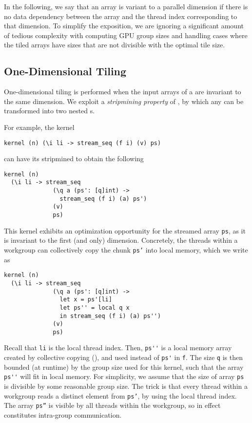 In the following, we say that an array is variant to a parallel
dimension if there is no data dependency between the array and the
thread index corresponding to that dimension.  To simplify the
exposition, we are ignoring a significant amount of tedious complexity
with computing GPU group sizes and handling cases where the tiled
arrays have sizes that are not divisible with the optimal tile size.

\subsection{One-Dimensional Tiling}
\label{sec:one-dimensional-tiling}

One-dimensional tiling is performed when the input arrays of a
\StreamSeq{} are invariant to the same dimension.  We exploit a
\textit{stripmining property} of \StreamSeq{}, by which any
\StreamSeq{} can be transformed into two nested
\StreamSeq{}s.

For example, the kernel
\begin{lstlisting}
kernel (n) (\i li -> stream_seq (f i) (v) ps)
\end{lstlisting}
\noindent can have its \StreamSeq{} stripmined to obtain the following
\begin{lstlisting}
kernel (n)
  (\i li -> stream_seq
              (\q a (ps': [q]int) ->
                stream_seq (f i) (a) ps')
              (v)
              ps)
\end{lstlisting}

This kernel exhibits an optimization opportunity for the streamed
array \lstinline{ps}, as it is invariant to the first (and only)
dimension.  Concretely, the threads within a workgroup can
collectively copy the chunk \texttt{ps'} into local memory, which we
write as
\begin{lstlisting}
kernel (n)
  (\i li -> stream_seq
              (\q a (ps': [q]int) ->
                let x = ps'[li]
                let ps'' = local q x
                in stream_seq (f i) (a) ps'')
              (v)
              ps)
\end{lstlisting}
\noindent Recall that \texttt{li} is the local thread index.  Then,
\lstinline{ps''} is a local memory array created by collective copying
(), and used instead of \lstinline{ps'} in
\lstinline{f}. The size \lstinline{q} is then bounded (at runtime) by
the group size used for this kernel, such that the array
\lstinline{ps''} will fit in local memory.  For simplicity, we assume
that the size of array \texttt{ps} is divisible by some reasonable
group size.  The trick is that every thread within a workgroup reads a
distinct element from \texttt{ps'}, by using the local thread index.
The array \texttt{ps''} is visible by all threads within the
workgroup, so  in effect constitutes intra-group
communication.

